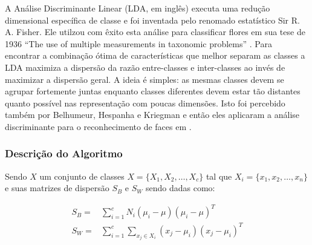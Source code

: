 A Análise Discriminante Linear (LDA, em inglês) executa uma redução dimensional específica de classe e foi inventada pelo renomado estatístico Sir R. A. Fisher. Ele utilzou com êxito esta análise para classificar flores em sua tese de 1936 ``The use of multiple measurements in taxonomic problems'' \cite{fisher1936use}. Para encontrar a combinação ótima de características que melhor separam as  classes a LDA maximiza a dispersão da razão entre-classes e inter-classes ao invés de maximizar a dispersão geral. A ideia é simples: as mesmas classes devem se agrupar fortemente juntas enquanto classes diferentes devem estar tão distantes quanto possível nas representação com poucas dimensões. Isto foi percebido também por Belhumeur, Hespanha e Kriegman e então eles aplicaram a análise discriminante para o reconhecimento de faces em \cite{fisherfaces}.

\subsubsection*{Descrição do Algoritmo} %

Sendo $X$ um conjunto de classes $X  = \{X_1,X_2,\ldots,X_c\}$ tal que  $X_i  = \{x_1, x_2, \ldots, x_n\}$ e suas matrizes de dispersão  $S_{B}$ e $S_{W}$ sendo dadas como:

\begin{align*} 
    S_{B} = & \sum_{i=1}^{c} N_{i} (\mu_i - \mu)(\mu_i - \mu)^{T} \\ 
    S_{W} = & \sum_{i=1}^{c} \sum_{x_{j} \in X_{i}} (x_j - \mu_i)(x_j - \mu_i)^{T} 
\end{align*}

